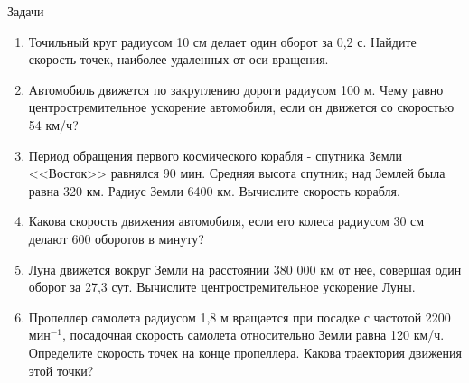 \documentclass[a6paper, 11pt]{diss_4}
\renewcommand{\'}{\,'}
\begin{document}
\begin{center}
   Задачи
\end{center}
\begin{enumerate}
\item Точильный круг радиусом 10 см делает  один  оборот  за 0,2 с. Найдите  скорость точек,   наиболее   удаленных   от   оси   вращения.
\item Автомобиль движется по закруглению дороги радиусом 100 м. Чему равно центростремительное ускорение  автомобиля,  если он движется со скоростью 54 км/ч?
\item Период   обращения    первого    космического корабля - спутника Земли <<Восток>> равнялся 90 мин. Средняя высота спутник; над Землей была равна 320 км. Радиус Земли 6400 км. Вычислите скорость корабля.
\item Какова скорость  движения автомобиля, если его колеса радиусом 30 см делают 600 оборотов в минуту?
\item Луна движется  вокруг Земли  на расстоянии  380 000  км  от  нее,   совершая  один оборот за 27,3 сут. Вычислите центростремительное ускорение Луны.
\item Пропеллер самолета радиусом 1,8 м вращается при посадке с частотой 2200 $мин^{-1}$, посадочная скорость самолета относительно Земли равна 120 км/ч. Определите скорость точек на конце пропеллера. Какова траектория движения этой точки?
\end{enumerate}
\end{document}
